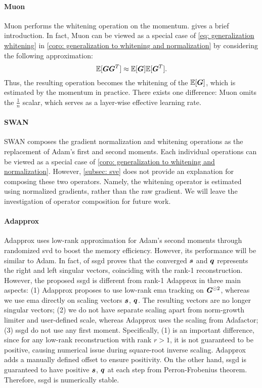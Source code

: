 \paragraph{Muon}
Muon \citep{jordan2024muon} performs the whitening operation on the momentum.  gives a brief introduction. In fact, Muon can be viewed as a special case of \cref{eq: generalization whitening} in \cref{coro: generalization to whitening and normalization} by considering the following approximation:
\begin{equation}
    \mathbb{E}[{\bm{G}}{\bm{G}}^T] \approx \mathbb{E}[{\bm{G}}]\mathbb{E}[{\bm{G}}^T].
\end{equation}
Thus, the resulting operation becomes the whitening of the $\mathbb{E}[{\bm{G}}]$, which is estimated by the momentum in practice. There exists one difference: Muon omits the $\frac{1}{n}$ scalar, which serves as a layer-wise effective learning rate. 

\paragraph{SWAN}
SWAN composes the gradient normalization and whitening operations as the replacement of Adam's first and second moments. Each individual operations can be viewed as a special case of \cref{coro: generalization to whitening and normalization}. However, \cref{subsec: sve} does not provide an explanation for composing these two operators. Namely, the whitening operator is estimated using normalized gradients, rather than the raw gradient. We will leave the investigation of operator composition for future work. 

\paragraph{Adapprox}
Adapprox \citep{zhao2024adapprox} uses low-rank approximation for Adam's second moments through randomized \gls{svd} to boost the memory efficiency. However, its performance will be similar to Adam. In fact,  of \gls{ssgd} proves that the converged ${\bm{s}}$ and ${\bm{q}}$ represents the right and left singular vectors, coinciding with the rank-1 reconstruction. However, the proposed \gls{ssgd} is different from rank-1 Adapprox in three main aspects: (1) Adapprox proposes to use low-rank \gls{ema} tracking on ${\bm{G}}^{\odot 2}$, whereas we use \gls{ema} directly on scaling vectors ${\bm{s}}$, ${\bm{q}}$. The resulting vectors are no longer singular vectors; (2) we do not have separate scaling apart from norm-growth limiter and user-defined scale, whereas Adapprox uses the scaling from Adafactor; (3) \gls{ssgd} do not use any first moment. Specifically, (1) is an important difference, since for any low-rank reconstruction with rank $r>1$, it is not guaranteed to be positive, causing numerical issue during square-root inverse scaling. Adapprox adds a manually defined offset to ensure positivity. On the other hand, \gls{ssgd} is guaranteed to have positive ${\bm{s}}$, ${\bm{q}}$ at each step from Perron-Frobenius theorem. Therefore, \gls{ssgd} is numerically stable. 

